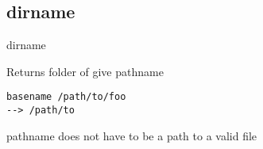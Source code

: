 \subsection{dirname}

\begin{frame}[fragile]{dirname}
  \begin{exampleblock}{Returns folder of give pathname}
    \begin{lstlisting}[showstringspaces=false]
basename /path/to/foo
--> /path/to
    \end{lstlisting}
  \end{exampleblock}
  \pause
pathname does not have to be a path to a valid file
\end{frame}
